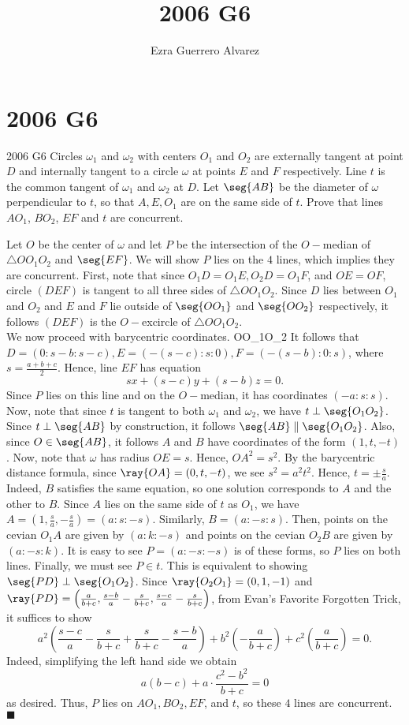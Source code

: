 \documentclass[14pt]{article}
\title{2006 G6}
\author{Ezra Guerrero Alvarez}
\begin{document}
\maketitle
	
\section*{2006 G6}

\begin{statement}{2006 G6}
	Circles $\omega_1$ and $\omega_2$ with centers $O_1$ and 
	$O_2$ are externally tangent at point $D$ and internally 
	tangent to a circle $\omega$ at points $E$ and $F$ 
	respectively. Line $t$ is the common tangent of $\omega_1$ 
	and $\omega_2$ at $D$. Let $\seg{AB}$ be the diameter of 
	$\omega$ perpendicular to $t$, so that $A, E, O_1$ are on 
	the same side of $t$. Prove that lines $AO_1$, $BO_2$, $EF$ 
	and $t$ are concurrent.
\end{statement}
Let $O$ be the center of $\omega$ and let $P$ be the 
intersection of the $O-$median of $\triangle OO_1O_2$ and 
$\seg{EF}$. We will show $P$ lies on the $4$ lines, which 
implies they are concurrent. First, note that since 
$O_1D=O_1E,O_2D=O_1F$, and $OE=OF$, circle $(DEF)$ is tangent to 
all three sides of $\triangle OO_1O_2$. Since $D$ lies between 
$O_1$ and $O_2$ and $E$ and $F$ lie outside of $\seg{OO_1}$ and 
$\seg{OO_2}$ respectively, it follows $(DEF)$ is the 
$O-$excircle of $\triangle OO_1O_2$. \\
We now proceed with barycentric coordinates. \bary O{O_1}{O_2} 
It follows that $D=(0:s-b:s-c),E=(-(s-c):s:0),F=(-(s-b):0:s)$, 
where $s=\frac{a+b+c}2$. Hence, line $EF$ has equation
\[ sx+(s-c)y+(s-b)z=0. \]
Since $P$ lies on this line and on the $O-$median, it has 
coordinates $(-a:s:s)$. Now, note that since $t$ is tangent to 
both $\omega_1$ and $\omega_2$, we have $t\perp\seg{O_1O_2}$. 
Since $t\perp\seg{AB}$ by construction, it follows 
$\seg{AB}\parallel\seg{O_1O_2}$. Also, since $O\in\seg{AB}$, it 
follows $A$ and $B$ have coordinates of the form $(1,t,-t)$. 
Now, note that $\omega$ has radius $OE=s$. Hence, $OA^2=s^2$. By 
the barycentric distance formula, since $\ray{OA}=(0,t,-t)$, we 
see $s^2=a^2t^2$. Hence, $t=\pm\frac sa$. Indeed, $B$ satisfies 
the same equation, so one solution corresponds to $A$ and the 
other to $B$. Since $A$ lies on the same side of $t$ as $O_1$, 
we have $A=\left(1,\frac sa,-\frac sa\right)=(a:s:-s)$. 
Similarly, $B=(a:-s:s)$. Then, points on the cevian $O_1A$ are 
given by $(a:k:-s)$ and points on the cevian $O_2B$ are given by 
$(a:-s:k)$. It is easy to see $P=(a:-s:-s)$ is of these forms, 
so $P$ lies on both lines. Finally, we must see $P\in t$. This 
is equivalent to showing $\seg{PD}\perp\seg{O_1O_2}$. Since 
$\ray{O_2O_1}=(0,1,-1)$ and $\ray{PD}=\left(\frac 
a{b+c},\frac{s-b}a-\frac s{b+c},\frac{s-c}a-\frac 
s{b+c}\right)$, from Evan's Favorite Forgotten Trick, it 
suffices to show
\[ a^2\left(\frac{s-c}a-\frac s{b+c}+\frac 
s{b+c}-\frac{s-b}a\right)+b^2\left(-\frac 
a{b+c}\right)+c^2\left(\frac a{b+c}\right)=0.\]
Indeed, simplifying the left hand side we obtain
\[ a(b-c)+a\cdot\frac{c^2-b^2}{b+c}=0 \]
as desired. Thus, $P$ lies on $AO_1,BO_2,EF$, and $t$, so these 
$4$ lines are concurrent. $\blacksquare$ 
	
\end{document}
